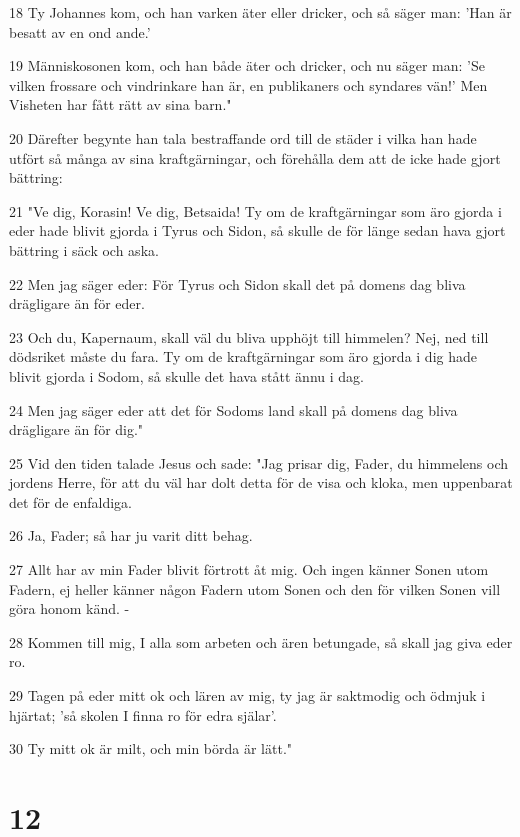 \par 18 Ty Johannes kom, och han varken äter eller dricker, och så säger man: 'Han är besatt av en ond ande.'
\par 19 Människosonen kom, och han både äter och dricker, och nu säger man: 'Se vilken frossare och vindrinkare han är, en publikaners och syndares vän!' Men Visheten har fått rätt av sina barn."
\par 20 Därefter begynte han tala bestraffande ord till de städer i vilka han hade utfört så många av sina kraftgärningar, och förehålla dem att de icke hade gjort bättring:
\par 21 "Ve dig, Korasin! Ve dig, Betsaida! Ty om de kraftgärningar som äro gjorda i eder hade blivit gjorda i Tyrus och Sidon, så skulle de för länge sedan hava gjort bättring i säck och aska.
\par 22 Men jag säger eder: För Tyrus och Sidon skall det på domens dag bliva drägligare än för eder.
\par 23 Och du, Kapernaum, skall väl du bliva upphöjt till himmelen? Nej, ned till dödsriket måste du fara. Ty om de kraftgärningar som äro gjorda i dig hade blivit gjorda i Sodom, så skulle det hava stått ännu i dag.
\par 24 Men jag säger eder att det för Sodoms land skall på domens dag bliva drägligare än för dig."
\par 25 Vid den tiden talade Jesus och sade: "Jag prisar dig, Fader, du himmelens och jordens Herre, för att du väl har dolt detta för de visa och kloka, men uppenbarat det för de enfaldiga.
\par 26 Ja, Fader; så har ju varit ditt behag.
\par 27 Allt har av min Fader blivit förtrott åt mig. Och ingen känner Sonen utom Fadern, ej heller känner någon Fadern utom Sonen och den för vilken Sonen vill göra honom känd. -
\par 28 Kommen till mig, I alla som arbeten och ären betungade, så skall jag giva eder ro.
\par 29 Tagen på eder mitt ok och lären av mig, ty jag är saktmodig och ödmjuk i hjärtat; 'så skolen I finna ro för edra själar'.
\par 30 Ty mitt ok är milt, och min börda är lätt."

\chapter{12}


